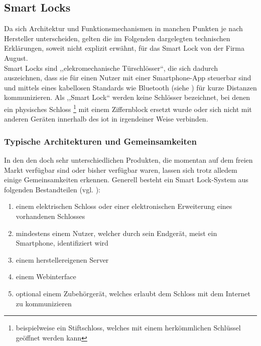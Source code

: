 \subsection{Smart Locks}
\label{sec:sota_smart_locks}
	Da sich Architektur und Funktionsmechanismen in manchen Punkten je nach Hersteller unterscheiden, gelten die im Folgenden dargelegten technischen Erklärungen, soweit nicht explizit erwähnt, für das Smart Lock von der Firma August. 
    \medskip\\
    \noindent Smart Locks sind ,,elekromechanische Türschlösser``, die sich dadurch auszeichnen, dass sie für einen Nutzer mit einer Smartphone-App steuerbar sind und mittels eines kabellosen Standards wie Bluetooth (siehe ) für kurze Distanzen kommunizieren.
	Als ,,Smart Lock`` werden keine Schlösser bezeichnet, bei denen ein physisches Schloss
	\footnote{beispielweise ein Stiftschloss, welches mit einem herkömmlichen Schlüssel geöffnet werden kann} 
	mit einem Ziffernblock ersetzt wurde oder sich nicht mit anderen Geräten innerhalb des \gls{iot} in irgendeiner Weise verbinden.\cite{Ho2016}
	
	\subsubsection{Typische Architekturen und Gemeinsamkeiten}
	    In den den doch sehr unterschiedlichen Produkten, die momentan auf dem freien Markt verfügbar sind oder bisher verfügbar waren, lassen sich trotz alledem einige Gemeinsamkeiten erkennen\cite{Ye2017,Fuller2017}. 
    	\noindent Generell besteht ein Smart Lock-System aus folgenden Bestandteilen (vgl. ):
    	\begin{enumerate}[noitemsep]
    		\item einem elektrischen Schloss oder einer elektronischen Erweiterung eines vorhandenen Schlosses
    		\item mindestens einem Nutzer, welcher durch sein Endgerät, meist ein Smartphone, identifiziert wird
    		\item einem herstellereigenen Server
    		\item einem Webinterface
    		\item optional einem Zubehörgerät, welches erlaubt dem Schloss mit dem Internet zu kommunizieren
    	\end{enumerate}
    
